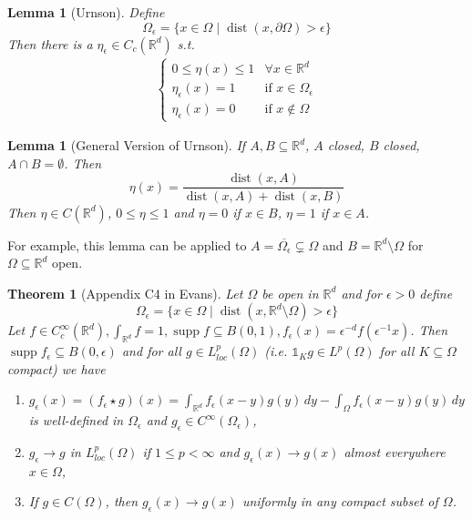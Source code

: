 \documentclass{report}
\theoremstyle{tommy}
\newtheorem{thm}[defn]{Theorem}
\newtheorem{lem}[defn]{Lemma}
\newcommand{\dist}{\operatorname{dist}}
\newcommand{\supp}{\operatorname{supp}}
\begin{document}
  \begin{lem}[Urnson]
    Define 
    \[\Omega_\epsilon = \{x \in \Omega \mid \dist(x, \partial \Omega) > \epsilon\}\]
    Then there is a \(\eta_\epsilon \in C_c(\mathbb{R}^d)\) s.t.
    \begin{align*}
      \begin{cases}
        0 \le \eta(x) \le 1 & \forall x \in \mathbb{R}^d \\
        \eta_\epsilon(x) = 1 & \text{if } x \in \Omega_\epsilon \\
        \eta_\epsilon(x) = 0 & \text{if } x \notin \Omega
      \end{cases}
    \end{align*}
  \end{lem}

  \begin{lem}[General Version of Urnson]
    If \(A, B \subseteq \mathbb{R}^d\), \(A\) closed, \(B\) closed, \(A \cap B = \emptyset\). Then
    \[\eta(x) = \frac{\dist(x, A)}{\dist(x, A) + \dist(x, B)}\]
    Then \(\eta \in C(\mathbb{R}^d)\), \(0 \le \eta \le 1\) and \(\eta = 0\) if \(x \in B\), \(\eta = 1\) if \(x \in A\).
  \end{lem}

  For example, this lemma can be applied to \(A = \overline{\Omega_\epsilon} \subsetneq \Omega\) and \(B = \mathbb{R}^d \setminus \Omega\) for \(\Omega \subseteq \mathbb{R}^d\) open.

  
  \begin{thm}[Appendix C4 in Evans]
    Let \(\Omega\) be open in \(\mathbb{R}^d\) and for \(\epsilon > 0\) define
    \[\Omega_\epsilon = \{x \in \Omega \mid \dist(x, \mathbb{R}^d \setminus \Omega) > \epsilon\}\]
    Let \(f \in C_c^\infty(\mathbb{R}^d), \int_{\mathbb{R}^d} f = 1, \supp f \subseteq B(0, 1), f_\epsilon(x) = \epsilon^{-d} f(\epsilon^{-1} x)\). Then \(\supp f_\epsilon \subseteq B(0, \epsilon)\) and for all \(g \in L_{loc}^p(\Omega)\) (i.e. \(\mathbb{1}_K g \in L^p(\Omega)\) for all \(K \subseteq \Omega\) compact) we have
    \begin{enumerate}[label=\alph*)]
      \item \(g_\epsilon(x) = (f_\epsilon \star g)(x) = \int_{\mathbb{R}^d} f_\epsilon(x-y) g(y) \, dy - \int_\Omega f_\epsilon(x-y) g(y) \, dy\) is well-defined in \(\Omega_\epsilon\) and \(g_\epsilon \in C^\infty(\Omega_\epsilon)\),
      \item \(g_\epsilon \to g\) in \(L_{loc}^p(\Omega)\) if \(1 \le p < \infty\) and \(g_\epsilon(x) \to g(x)\) almost everywhere \(x \in \Omega\),
      \item If \(g \in C(\Omega)\), then \(g_\epsilon(x) \to g(x)\) uniformly in any compact subset of \(\Omega\).
    \end{enumerate}
  \end{thm}
\end{document}
